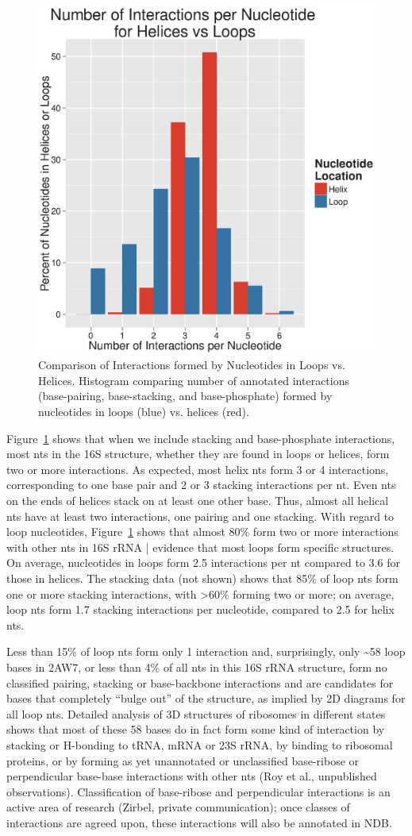 \begin{figure}
  \includegraphics[width=0.5\linewidth]{chapter-1/figs/inter-loop-v-helix}
  \caption{Comparison of Interactions formed by Nucleotides in Loops vs.
  Helices. Histogram comparing number of annotated interactions (base-pairing,
base-stacking, and base-phosphate) formed by nucleotides in loops (blue) vs.
helices (red).}
  \label{fig:ec-inter-loop-v-helix}
\end{figure}

Figure~\ref{fig:ec-inter-loop-v-helix} shows that when we include stacking and
base-phosphate interactions, most nts in the 16S structure, whether they are
found in loops or helices, form two or more interactions. As expected, most
helix nts form 3 or 4 interactions, corresponding to one base pair and 2 or 3
stacking interactions per nt. Even nts on the ends of helices stack on at least
one other base. Thus, almost all helical nts have at least two interactions, one
pairing and one stacking. With regard to loop nucleotides,
Figure~\ref{fig:ec-inter-loop-v-helix} shows that almost 80\% form two or more
interactions with other nts in 16S rRNA | evidence that most loops form specific
structures. On average, nucleotides in loops form
2.5 interactions per nt compared to 3.6 for those in helices. The stacking data
(not shown) shows that 85\% of loop nts form one or more stacking
interactions, with >60\% forming two or more; on average, loop nts form 1.7
stacking interactions per nucleotide, compared to 2.5 for helix nts. 

Less than 15\% of loop nts form only 1 interaction and, surprisingly, only \textasciitilde 58
loop bases in 2AW7, or less than 4\% of all nts in this 16S rRNA structure, form
no classified pairing, stacking or base-backbone interactions and are candidates
for bases that completely “bulge out” of the structure, as implied by 2D
diagrams for all loop nts. Detailed analysis of 3D structures of ribosomes in
different states shows that most of these 58 bases do in fact form some kind of
interaction by stacking or H-bonding to tRNA, mRNA or 23S rRNA, by binding to
ribosomal proteins, or by forming as yet unannotated or unclassified base-ribose
or perpendicular base-base interactions with other nts (Roy et al., unpublished
observations). Classification of base-ribose and perpendicular interactions is
an active area of research (Zirbel, private communication); once classes of
interactions are agreed upon, these interactions will also be annotated in NDB. 

